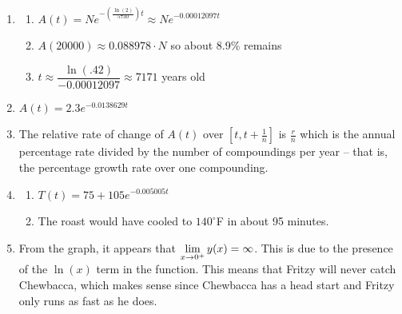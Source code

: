 \documentclass{ximera}
\begin{document}
\begin{enumerate}
\begin{enumerate}
\begin{multicols}{6}
\begin{itemize}
\item $\approx 2.500$

\item $\approx 2.498$

\item$\approx 2.487$

\end{itemize}

\end{multicols}

\end{enumerate}


\item \begin{enumerate}

\item $A(t) = Ne^{-\left(\frac{\ln(2)}{5730}\right)t} \approx Ne^{-0.00012097t}$
\item $A(20000) \approx 0.088978 \cdot N$ so about 8.9\% remains
\item $t \approx \dfrac{\ln(.42)}{-0.00012097} \approx 7171$ years old

\end{enumerate}

\item $A(t) = 2.3e^{-0.0138629t}$

\item  The relative rate of change of $A(t)$ over $\left[t, t+\frac{1}{n} \right]$ is $\frac{r}{n}$ which is the annual percentage rate divided by the number of compoundings per year -- that is,  the percentage growth rate over one compounding.

\addtocounter{enumi}{1}

\item \begin{enumerate}

\item $T(t) = 75 + 105e^{-0.005005t}$

\item The roast would have cooled to $140^{\circ}$F in about 95 minutes.

\end{enumerate}

\item From the graph, it appears that $\ds{\lim_{x \rightarrow 0^{+}} y(x) = \infty}$.  This is due to the presence of the $\ln(x)$ term in the function.  This means that Fritzy will never catch Chewbacca, which makes sense since Chewbacca has a head start and Fritzy only runs as fast as he does.


\end{enumerate}
\end{document}

